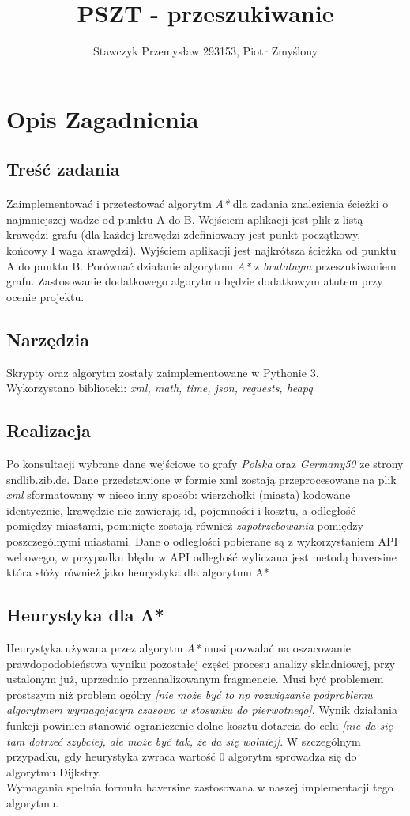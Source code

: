 \documentclass[11pt]{article} %
\title{PSZT - przeszukiwanie}
\author{Stawczyk Przemysław 293153, Piotr Zmyślony}
\date{} %
\begin{document}
\maketitle

\section{Opis Zagadnienia}
\subsection{Treść zadania}
\paragraph{}
Zaimplementować i przetestować algorytm \textsl{A*} dla zadania znalezienia ścieżki o najmniejszej wadze od punktu A do B. Wejściem aplikacji jest plik z listą krawędzi grafu (dla każdej krawędzi zdefiniowany jest punkt początkowy, końcowy I waga krawędzi). Wyjściem aplikacji jest najkrótsza ścieżka od punktu A do punktu B. Porównać działanie algorytmu \textsl{A*}  z \textsl{brutalnym} przeszukiwaniem grafu. Zastosowanie dodatkowego algorytmu będzie dodatkowym atutem przy ocenie projektu.
\subsection{Narzędzia}
Skrypty oraz algorytm zostały zaimplementowane w Pythonie 3. \\
Wykorzystano biblioteki: \textsl{xml, math, time, json, requests, heapq }
\subsection{Realizacja}
Po konsultacji wybrane dane wejściowe to grafy  \textsl{Polska} oraz  \textsl{Germany50} ze strony sndlib.zib.de. Dane przedstawione w formie xml zostają przeprocesowane na plik  \textsl{xml} sformatowany w nieco inny sposób: wierzchołki (miasta) kodowane identycznie, krawędzie nie zawierają id, pojemności i kosztu, a odległość pomiędzy miastami, pominięte zostają również  \textsl{zapotrzebowania} pomiędzy poszczególnymi miastami. 
Dane o odległości pobierane są z wykorzystaniem API webowego, w przypadku błędu w API odległość wyliczana jest metodą haversine która słóży również jako heurystyka dla algorytmu A*
\subsection{Heurystyka dla A*}
Heurystyka używana przez algorytm \textsl{A*}  musi pozwalać na oszacowanie prawdopodobieństwa wyniku pozostałej części procesu analizy składniowej, przy ustalonym już, uprzednio przeanalizowanym fragmencie. Musi być problemem prostszym niż problem ogólny \textsl{[nie może być to np rozwiązanie podproblemu algorytmem wymagajacym czasowo w stosunku do pierwotnego]}. Wynik działania funkcji powinien stanowić ograniczenie dolne kosztu dotarcia do celu \textsl{[nie da się tam dotrzeć szybciej, ale może być tak, że da się wolniej]}. W szczególnym przypadku, gdy heurystyka zwraca wartość 0 algorytm sprowadza się do algorytmu Dijkstry.\\
Wymagania spełnia formuła haversine zastosowana w naszej implementacji tego algorytmu.
\end{document}
